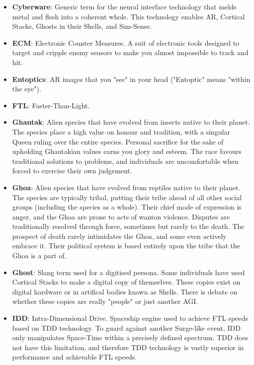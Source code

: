 \documentclass[10pt,twoside]{article}
\begin{document}
\begin{multicols}{2}
\begin{itemize}
            \item \textbf{Cyberware}: Generic term for the neural interface technology that melds metal and flesh into a coherent whole. This technology enables AR, Cortical Stacks, Ghosts in their Shells, and Sim-Sense.

            \item \textbf{ECM}: Electronic Counter Measures. A suit of electronic tools designed to target and cripple enemy sensors to make you almost impossible to track and hit.

            \item \textbf{Entoptics}: AR images that you "see" in your head ("Entoptic" means "within the eye").

            \item \textbf{FTL}: Faster-Than-Light.

            \item \textbf{Ghantak}: Alien species that have evolved from insects native to their planet. The species place a high value on honour and tradition, with a singular Queen ruling over the entire species. Personal sacrifice for the sake of upholding Ghantakian values earns you glory and esteem. The race favours traditional solutions to problems, and individuals are uncomfortable when forced to exercise their own judgement.

            \item \textbf{Ghoa}: Alien species that have evolved from reptiles native to their planet. The species are typically tribal, putting their tribe ahead of all other social groups (including the species as a whole). Their chief mode of expression is anger, and the Ghoa are prone to acts of wanton violence. Disputes are traditionally resolved through force, sometimes but rarely to the death. The prospect of death rarely intimidates the Ghoa, and some even actively embrace it. Their political system is based entirely upon the tribe that the Ghoa is a part of.

            \item \textbf{Ghost}: Slang term used for a digitised persona. Some individuals have used Cortical Stacks to make a digital copy of themselves. These copies exist on digital hardware or in artifical bodies known as Shells. There is debate on whether these copies are really "people" or just another AGI.

            \item \textbf{IDD}: Intra-Dimensional Drive. Spaceship engine used to achieve FTL speeds based on TDD technology. To guard against another Surge-like event, IDD only manipulates Space-Time within a precisely defined spectrum. TDD does not have this limitation, and therefore TDD technology is vastly superior in performance and achievable FTL speeds.


\end{itemize}
\end{multicols}
\end{document}
